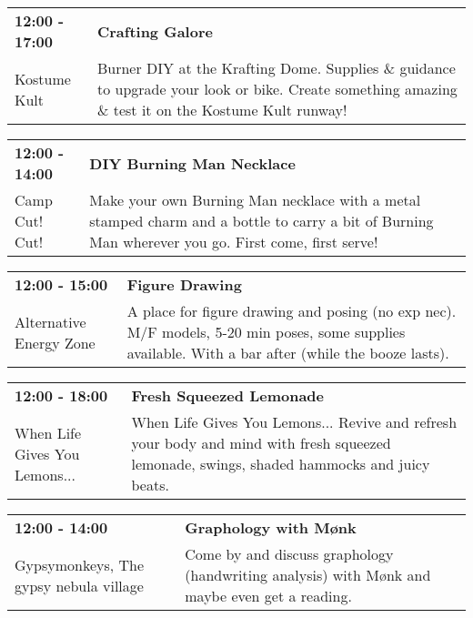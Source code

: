 \begin{tabular}{ p{1in} p{2.2in} }
    \textbf{12:00 - 17:00} & \textbf{Crafting Galore} \\
    Kostume Kult \newline  & Burner DIY at the Krafting Dome. Supplies \& guidance to upgrade your look or bike. Create something amazing \& test it on the Kostume Kult runway! \\
    \hline 
\end{tabular}
    
\begin{tabular}{ p{1in} p{2.2in} }
    \textbf{12:00 - 14:00} & \textbf{DIY Burning Man Necklace} \\
    Camp Cut! Cut! \newline  & Make your own Burning Man necklace with a metal stamped charm and a bottle to carry a bit of Burning Man wherever you go. First come, first serve! \\
    \hline 
\end{tabular}
    
\begin{tabular}{ p{1in} p{2.2in} }
    \textbf{12:00 - 15:00} & \textbf{Figure Drawing} \\
    Alternative Energy Zone \newline  & A place for figure drawing and posing (no exp nec).  M/F models, 5-20 min poses, some supplies available. With a bar after (while the booze lasts). \\
    \hline 
\end{tabular}
    
\begin{tabular}{ p{1in} p{2.2in} }
    \textbf{12:00 - 18:00} & \textbf{Fresh Squeezed Lemonade} \\
    When Life Gives You Lemons... \newline  & When Life Gives You Lemons... Revive and refresh your body and mind with fresh squeezed lemonade, swings, shaded hammocks and juicy beats. \\
    \hline 
\end{tabular}
    
\begin{tabular}{ p{1in} p{2.2in} }
    \textbf{12:00 - 14:00} & \textbf{Graphology with M\o nk} \\
    Gypsymonkeys, The \newline gypsy nebula village & Come by and discuss graphology (handwriting analysis) with M\o nk and maybe even get a reading. \\
    \hline 
\end{tabular}
    
